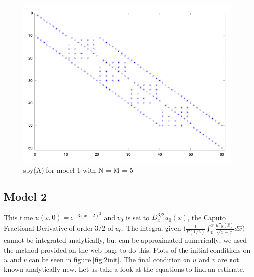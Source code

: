 \documentclass{article}
\renewcommand{\(}{\left(}
\renewcommand{\)}{\right)}
\begin{document}
\begin{figure}
\centering
\includegraphics[width=\textwidth]{spy.png}
\caption{spy(A) for model 1 with N = M = 5}
\label{fig:spy}
\end{figure}

\subsection*{Model 2}
This time $u(x, 0) = e^{-3(x-2)^2}$ and $v_0$ is set to $D^{3/2}_xu_0(x)$, the Caputo Fractional Derivative of order $3/2$ of $u_0$. The integral given ($\frac{1}{\Gamma(1/2)}\int_0^x{\frac{u''_0(\hat x)}{\sqrt{x-\hat x}}d\hat x}$) cannot be integrated analytically, but can be approximated numerically; we used the method provided on the web page to do this. Plots of the initial conditions on $u$ and $v$ can be seen in figure \ref{fig:2init}. The final condition on $u$ and $v$ are not known analytically now. Let us take a look at the equations to find an estimate.
\end{document}
